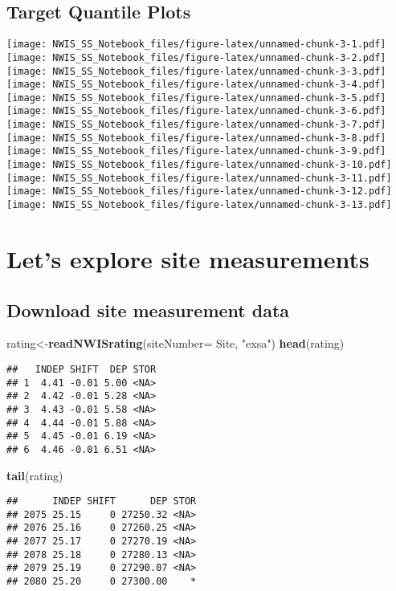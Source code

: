 \documentclass[]{article}
\newenvironment{Shaded}{\begin{snugshade}}{\end{snugshade}}
\newcommand{\KeywordTok}[1]{\textcolor[rgb]{0.13,0.29,0.53}{\textbf{#1}}}
\newcommand{\DataTypeTok}[1]{\textcolor[rgb]{0.13,0.29,0.53}{#1}}
\newcommand{\StringTok}[1]{\textcolor[rgb]{0.31,0.60,0.02}{#1}}
\newcommand{\NormalTok}[1]{#1}
\begin{document}
\subsection{Target Quantile Plots}\label{target-quantile-plots}

\texttt{[image: NWIS\_SS\_Notebook\_files/figure-latex/unnamed-chunk-3-1.pdf]}
\texttt{[image: NWIS\_SS\_Notebook\_files/figure-latex/unnamed-chunk-3-2.pdf]}
\texttt{[image: NWIS\_SS\_Notebook\_files/figure-latex/unnamed-chunk-3-3.pdf]}
\texttt{[image: NWIS\_SS\_Notebook\_files/figure-latex/unnamed-chunk-3-4.pdf]}
\texttt{[image: NWIS\_SS\_Notebook\_files/figure-latex/unnamed-chunk-3-5.pdf]}
\texttt{[image: NWIS\_SS\_Notebook\_files/figure-latex/unnamed-chunk-3-6.pdf]}
\texttt{[image: NWIS\_SS\_Notebook\_files/figure-latex/unnamed-chunk-3-7.pdf]}
\texttt{[image: NWIS\_SS\_Notebook\_files/figure-latex/unnamed-chunk-3-8.pdf]}
\texttt{[image: NWIS\_SS\_Notebook\_files/figure-latex/unnamed-chunk-3-9.pdf]}
\texttt{[image: NWIS\_SS\_Notebook\_files/figure-latex/unnamed-chunk-3-10.pdf]}
\texttt{[image: NWIS\_SS\_Notebook\_files/figure-latex/unnamed-chunk-3-11.pdf]}
\texttt{[image: NWIS\_SS\_Notebook\_files/figure-latex/unnamed-chunk-3-12.pdf]}
\texttt{[image: NWIS\_SS\_Notebook\_files/figure-latex/unnamed-chunk-3-13.pdf]}

\section{Let's explore site
measurements}\label{lets-explore-site-measurements}

\subsection{Download site measurement
data}\label{download-site-measurement-data}

\begin{Shaded}
\begin{Highlighting}[]
\NormalTok{rating<-}\KeywordTok{readNWISrating}\NormalTok{(}\DataTypeTok{siteNumber=}\NormalTok{ Site, }\StringTok{"exsa"}\NormalTok{)}
\KeywordTok{head}\NormalTok{(rating)}
\end{Highlighting}
\end{Shaded}

\begin{verbatim}
##   INDEP SHIFT  DEP STOR
## 1  4.41 -0.01 5.00 <NA>
## 2  4.42 -0.01 5.28 <NA>
## 3  4.43 -0.01 5.58 <NA>
## 4  4.44 -0.01 5.88 <NA>
## 5  4.45 -0.01 6.19 <NA>
## 6  4.46 -0.01 6.51 <NA>
\end{verbatim}

\begin{Shaded}
\begin{Highlighting}[]
\KeywordTok{tail}\NormalTok{(rating)}
\end{Highlighting}
\end{Shaded}

\begin{verbatim}
##      INDEP SHIFT      DEP STOR
## 2075 25.15     0 27250.32 <NA>
## 2076 25.16     0 27260.25 <NA>
## 2077 25.17     0 27270.19 <NA>
## 2078 25.18     0 27280.13 <NA>
## 2079 25.19     0 27290.07 <NA>
## 2080 25.20     0 27300.00    *
\end{verbatim}
\end{document}
